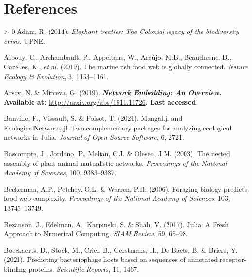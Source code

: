 \documentclass[11pt]{article}
\makeatletter
\def\maxwidth{\ifdim\Gin@nat@width>\linewidth\linewidth
\else\Gin@nat@width\fi}
\let\Oldincludegraphics\includegraphics
\renewcommand{\includegraphics}[1]{\Oldincludegraphics[width=\maxwidth]{#1}}
\newlength{\cslhangindent}
\newenvironment{CSLReferences}[3] %
 {%
  \setlength{\parindent}{0pt}
  \ifodd #1 \everypar{\setlength{\hangindent}{\cslhangindent}}\ignorespaces\fi
  \ifnum #2 > 0
  \setlength{\parskip}{#2\baselineskip}
  \fi
 }%
 {}
\providecommand{\DIFaddtex}[1]{{\bf #1}} %
\providecommand{\DIFdeltex}[1]{} %
\providecommand{\DIFaddbegin}{\protect\color{blue}} %
\providecommand{\DIFaddend}{\protect\color{black}} %
\providecommand{\DIFdelbegin}{\protect\color{red}} %
\providecommand{\DIFdelend}{\protect\color{black}} %
\providecommand{\DIFadd}[1]{\texorpdfstring{\DIFaddtex{#1}}{#1}} %
\providecommand{\DIFdel}[1]{\texorpdfstring{\DIFdeltex{#1}}{}} %
\newcommand{\DIFscaledelfig}{0.5}
\newlength{\DIFdelgraphicswidth} %
\newlength{\DIFdelgraphicsheight} %
\newcommand{\DIFaddincludegraphics}[2][]{{\color{blue}\fbox{\DIFOincludegraphics[#1]{#2}}}} %
\newcommand{\DIFdelincludegraphics}[2][]{%
\sbox{\DIFdelgraphicsbox}{\DIFOincludegraphics[#1]{#2}}%
\settoboxwidth{\DIFdelgraphicswidth}{\DIFdelgraphicsbox} %
\settoboxtotalheight{\DIFdelgraphicsheight}{\DIFdelgraphicsbox} %
\scalebox{\DIFscaledelfig}{%
\parbox[b]{\DIFdelgraphicswidth}{\usebox{\DIFdelgraphicsbox}\\[-\baselineskip] \rule{\DIFdelgraphicswidth}{0em}}\llap{\resizebox{\DIFdelgraphicswidth}{\DIFdelgraphicsheight}{%
\setlength{\unitlength}{\DIFdelgraphicswidth}%
\begin{picture}(1,1)%
\thicklines\linethickness{2pt} %
{\color[rgb]{1,0,0}\put(0,0){\framebox(1,1){}}}%
{\color[rgb]{1,0,0}\put(0,0){\line( 1,1){1}}}%
{\color[rgb]{1,0,0}\put(0,1){\line(1,-1){1}}}%
\end{picture}%
}\hspace*{3pt}}} %
} %
\DeclareRobustCommand{\DIFaddbegin}{\DIFOaddbegin \let\includegraphics\DIFaddincludegraphics} %
\DeclareRobustCommand{\DIFaddend}{\DIFOaddend \let\includegraphics\DIFOincludegraphics} %
\DeclareRobustCommand{\DIFdelbegin}{\DIFOdelbegin \let\includegraphics\DIFdelincludegraphics} %
\DeclareRobustCommand{\DIFdelend}{\DIFOaddend \let\includegraphics\DIFOincludegraphics} %
\makeatother
\begin{document}
\hypertarget{references}{%
\section*{References}\label{references}}

\hypertarget{refs}{}
\begin{CSLReferences}{1}{0}
\leavevmode\hypertarget{ref-Adam2014EleTre}{}%
Adam, R. (2014). \emph{Elephant treaties: The Colonial legacy of the
biodiversity crisis}. UPNE.

\leavevmode\hypertarget{ref-Albouy2019MarFis}{}%
Albouy, C., Archambault, P., Appeltans, W., Araújo, M.B., Beauchesne,
D., Cazelles, K., \emph{et al.} (2019). The marine fish food web is
globally connected. \emph{Nature Ecology \& Evolution}, 3, 1153--1161.

\leavevmode\hypertarget{ref-Arsov2019NetEmb}{}%
Arsov, N. \& Mirceva, G. (2019). \DIFdelbegin \DIFdel{Network Embedding: An Overview. \emph{arXiv:1911.11726 {[}cs, stat{]}}}\DIFdelend \DIFaddbegin \DIFadd{\emph{Network Embedding: An Overview}.
Available at: }\url{http://arxiv.org/abs/1911.11726}\DIFadd{. Last accessed}\DIFaddend .

\leavevmode\hypertarget{ref-Banville2021ManJl}{}%
Banville, F., Vissault, S. \& Poisot, T. (2021). Mangal.jl and
EcologicalNetworks.jl: Two complementary packages for analyzing
ecological networks in Julia. \emph{Journal of Open Source Software}, 6,
2721.

\leavevmode\hypertarget{ref-Bascompte2003NesAss}{}%
Bascompte, J., Jordano, P., Melian, C.J. \& Olesen, J.M. (2003). The
nested assembly of plant-animal mutualistic networks. \emph{Proceedings
of the National Academy of Sciences}, 100, 9383--9387.

\leavevmode\hypertarget{ref-Beckerman2006ForBio}{}%
Beckerman, A.P., Petchey, O.L. \& Warren, P.H. (2006). Foraging biology
predicts food web complexity. \emph{Proceedings of the National Academy
of Sciences}, 103, 13745--13749.

\leavevmode\hypertarget{ref-Bezanson2017JulFre}{}%
Bezanson, J., Edelman, A., Karpinski, S. \& Shah, V. (2017). Julia: A
Fresh Approach to Numerical Computing. \emph{SIAM Review}, 59, 65--98.

\leavevmode\hypertarget{ref-Boeckaerts2021PreBac}{}%
Boeckaerts, D., Stock, M., Criel, B., Gerstmans, H., De Baets, B. \&
Briers, Y. (2021). Predicting bacteriophage hosts based on sequences of
annotated receptor-binding proteins. \emph{Scientific Reports}, 11,
1467.


\end{CSLReferences}
\end{document}
